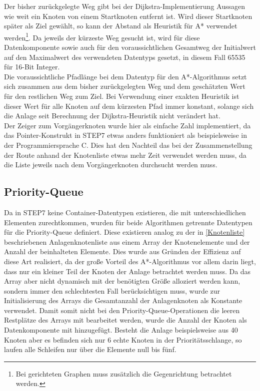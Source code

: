 			Der bisher zurückgelegte Weg gibt bei der Dijkstra-Implementierung Aussagen wie weit ein Knoten von einem Startknoten entfernt ist. Wird dieser Startknoten später als Ziel gewählt, so kann der Abstand als Heuristik für A* verwendet werden\footnote{Bei gerichteten Graphen muss zusätzlich die Gegenrichtung betrachtet werden.}. Da jeweils der kürzeste Weg gesucht ist, wird für diese Datenkomponente sowie auch für den voraussichtlichen Gesamtweg der Initialwert auf den Maximalwert des verwendeten Datentyps gesetzt, in diesem Fall 65535 für 16-Bit Integer.\\
			
			Die voraussichtliche Pfadlänge bei dem Datentyp für den A*-Algorithmus setzt sich zusammen aus dem bisher zurückgelegten Weg und dem geschätzten Wert für den restlichen Weg zum Ziel. Bei Verwendung einer exakten Heuristik ist dieser Wert für alle Knoten auf dem kürzesten Pfad immer konstant, solange sich die Anlage seit Berechnung der Dijkstra-Heuristik nicht verändert hat.\\
			
			Der Zeiger zum Vorgängerknoten wurde hier als einfache Zahl implementiert, da das Pointer-Konstrukt in \ac{STEP7} etwas anders funktioniert als beispielsweise in der Programmiersprache C. Dies hat den Nachteil das bei der Zusammenstellung der Route anhand der Knotenliste etwas mehr Zeit verwendet werden muss, da die Liste jeweils nach dem Vorgängerknoten durchsucht werden muss.
		
		\subsection{Priority-Queue}
		
			Da in \ac{STEP7} keine Container-Datentypen existieren, die mit unterschiedlichen Elementen zurechtkommen, wurden für beide Algorithmen getrennte Datentypen für die Priority-Queue definiert. Diese existieren analog zu der in \ref{Knotenliste} beschriebenen Anlagenknotenliste aus einem Array der Knotenelemente und der Anzahl der beinhalteten Elemente. Dies wurde aus Gründen der Effizienz auf diese Art realisiert, da der große Vorteil des A*-Algorithmus vor allem darin liegt, dass nur ein kleiner Teil der Knoten der Anlage betrachtet werden muss. Da das Array aber nicht dynamisch mit der benötigten Größe alloziert werden kann, sondern immer den schlechtesten Fall berücksichtigen muss, wurde zur Initialisierung des Arrays die Gesamtanzahl der Anlagenknoten als Konstante verwendet. Damit somit nicht bei den Priority-Queue-Operationen die leeren Restplätze des Arrays mit bearbeitet werden, wurde die Anzahl der Knoten als Datenkomponente mit hinzugefügt. Besteht die Anlage beispielsweise aus 40 Knoten aber es befinden sich nur 6 echte Knoten in der Prioritätsschlange, so laufen alle Schleifen nur über die Elemente null bis fünf.\\
			
